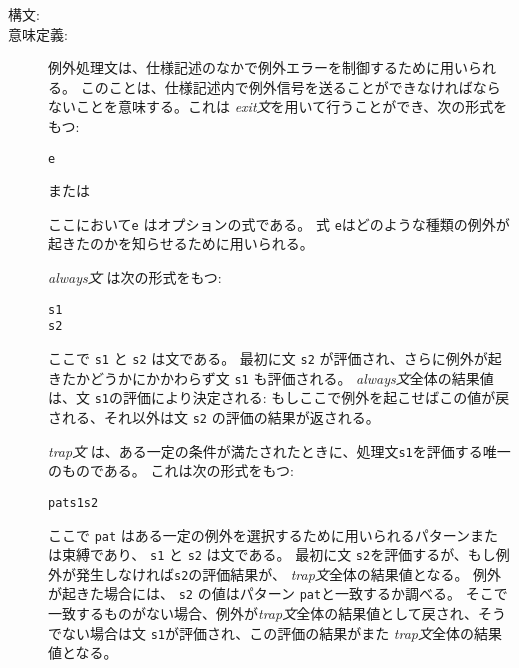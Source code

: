 \documentclass[\pformat,12pt]{jarticle}
\begin{document}
\begin{description}
\item[構文:]






\item[意味定義:] 例外処理文は、仕様記述のなかで例外エラーを制御するために用いられる。
このことは、仕様記述内で例外信号を送ることができなければならないことを意味する。これは {\it exit文}を用いて行うことができ、次の形式をもつ:
  \begin{alltt}
     e
  \end{alltt}
または
  \begin{alltt}
  \end{alltt}
 ここにおいて{\tt e} はオプションの式である。
式 {\tt e}はどのような種類の例外が起きたのかを知らせるために用いられる。

  {\it always文\/} は次の形式をもつ:
  \begin{alltt}
     s1 
    s2
  \end{alltt}
ここで {\tt s1} と {\tt s2} は文である。
最初に文 {\tt s2} が評価され、さらに例外が起きたかどうかにかかわらず文 {\tt s1} も評価される。
 {\it always文\/}全体の結果値は、文 {\tt s1}の評価により決定される: もしここで例外を起こせばこの値が戻される、それ以外は文 {\tt s2} の評価の結果が返される。

 {\it trap文\/} は、ある一定の条件が満たされたときに、処理文{\tt s1}を評価する唯一のものである。
これは次の形式をもつ:
\begin{alltt} 
     pat  s1  s2 
\end{alltt}
ここで {\tt pat} はある一定の例外を選択するために用いられるパターンまたは束縛であり、 {\tt s1} と {\tt s2} は文である。
最初に文 {\tt s2}を評価するが、もし例外が発生しなければ{\tt s2}の評価結果が、 {\it trap文\/}全体の結果値となる。
例外が起きた場合には、 {\tt s2} の値はパターン {\tt pat}と一致するか調べる。
そこで一致するものがない場合、例外が{\it trap文}全体の結果値として戻され、そうでない場合は文 {\tt s1}が評価され、この評価の結果がまた {\it trap文}全体の結果値となる。


\end{description}
\end{document}
